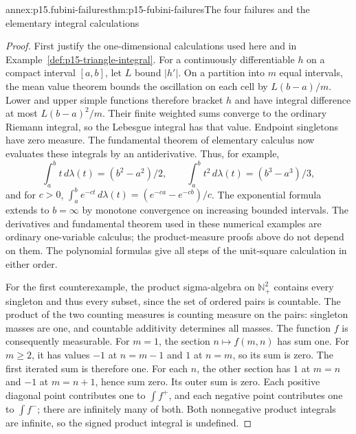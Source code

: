\begin{annexitem}{annex:p15.fubini-failures}{thm:p15-fubini-failures}{The four failures and the elementary integral calculations}
\begin{proof}
First justify the one-dimensional calculations used here and in
Example~\ref{def:p15-triangle-integral}. For a continuously
differentiable \(h\) on a compact interval \([a,b]\), let
\(L\) bound \(|h'|\). On a partition into \(m\) equal intervals,
the mean value theorem bounds the oscillation on each cell by
\(L(b-a)/m\). Lower and upper simple functions therefore bracket
\(h\) and have integral difference at most \(L(b-a)^2/m\).
Their finite weighted sums converge to the ordinary Riemann integral,
so the Lebesgue integral has that value. Endpoint singletons have
zero measure. The fundamental theorem of elementary calculus now
evaluates these integrals by an antiderivative. Thus, for example,
\[
 \int_a^b t\,d\lambda(t)=(b^2-a^2)/2,\qquad
 \int_a^b t^2\,d\lambda(t)=(b^3-a^3)/3,
\]
and for \(c>0\),
\(\int_a^b e^{-ct}\,d\lambda(t)=(e^{-ca}-e^{-cb})/c\).
The exponential formula extends to \(b=\infty\) by monotone
convergence on increasing bounded intervals. The derivatives and
fundamental theorem used in these numerical examples are ordinary
one-variable calculus; the product-measure proofs above do not depend
on them. The polynomial formulas give all steps of the unit-square
calculation in either order.

For the first counterexample, the product sigma-algebra on
\(\mathbb N_+^2\) contains every singleton and thus every subset,
since the set of ordered pairs is countable. The product of the two
counting measures is counting measure on the pairs: singleton masses
are one, and countable additivity determines all masses. The function
\(f\) is consequently measurable. For \(m=1\), the section
\(n\mapsto f(m,n)\) has sum one. For \(m\geq2\), it has
values \(-1\) at \(n=m-1\) and \(1\) at \(n=m\), so
its sum is zero. The first iterated sum is therefore one. For each
\(n\), the other section has \(1\) at \(m=n\) and \(-1\)
at \(m=n+1\), hence sum zero. Its outer sum is zero. Each
positive diagonal point contributes one to \(\int f^+\), and
each negative point contributes one to \(\int f^-\); there are
infinitely many of both. Both nonnegative product integrals are
infinite, so the signed product integral is undefined.


\end{proof}
\end{annexitem}
